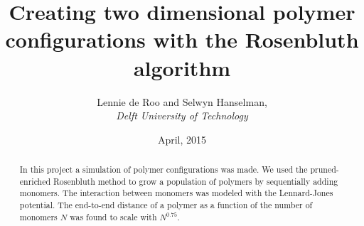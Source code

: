\documentclass{article}
\begin{document}
\renewcommand\bibsection{\subsection{\refname}}
\title{\textbf{Creating two dimensional polymer configurations with the Rosenbluth algorithm}}
\author{Lennie de Roo and Selwyn Hanselman, \\
 \emph{Delft University of Technology}}
\date{\normalsize{April, 2015}}
\maketitle 
\noindent \hrulefill
\begin{abstract}
\nonindent In this project a simulation of polymer configurations was made. We used the pruned-enriched Rosenbluth method to grow a population of polymers by sequentially adding monomers. The interaction between monomers was modeled with the Lennard-Jones potential. The end-to-end distance of a polymer as a function of the number of monomers $N$ was found to scale with $N^{0.75}$.
\end{abstract}
\hrulefill
\end{document}
